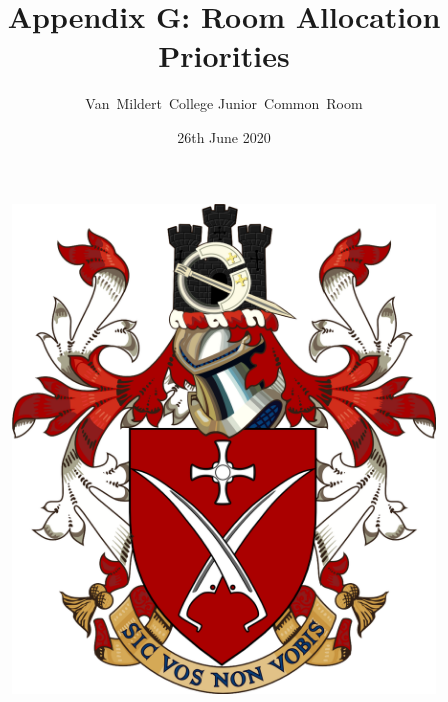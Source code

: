 \documentclass[12pt]{article}
\title{Appendix G: Room Allocation Priorities}
\author{Van~Mildert~College Junior~Common~Room}
\date{26th June 2020}
\begin{document}
    \begin{titlepage}  %
        \maketitle
        \begin{figure}[h]
            \includegraphics[scale=0.25]{arms}  %
            \centering
        \end{figure}
        \thispagestyle{empty}
    \end{titlepage}
    \setcounter{page}{2}  %
\end{document}
